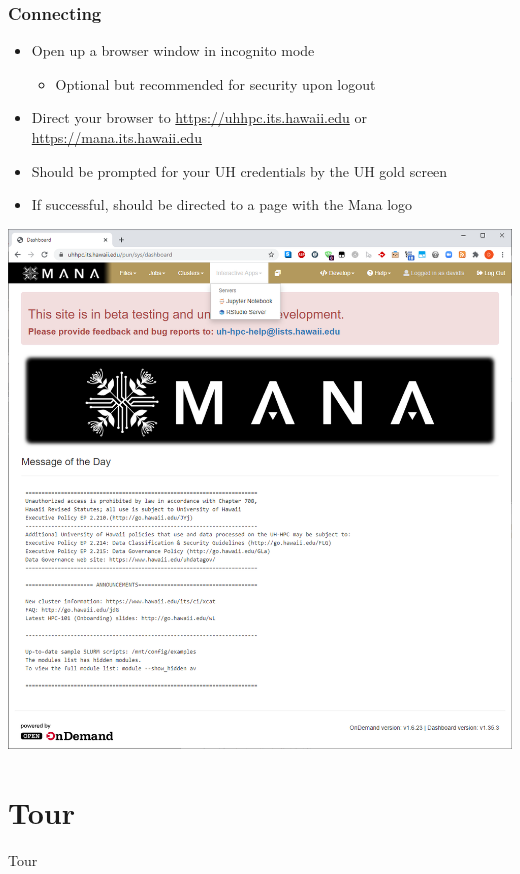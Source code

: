 \begin{frame}
\frametitle{Connecting}
			\begin{itemize}
				\item Open up a browser window in incognito mode
					\begin{itemize}
					\item Optional but recommended for security upon logout
					\end{itemize}						
				\item Direct your browser to \url{https://uhhpc.its.hawaii.edu} or \url{https://mana.its.hawaii.edu}
				\item Should be prompted for your UH credentials by the UH gold screen
				\item If successful, should be directed to a page with the Mana logo
			\end{itemize}
	\begin{center}
  \includegraphics[scale=0.15]{05.png}
	\end{center}			
\end{frame}

\section[WT]{Tour}
\begin{frame}
\Huge{\centerline{Tour}}
\end{frame}

